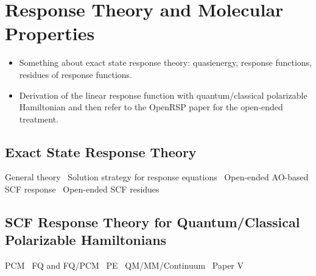\chapter{Response Theory and Molecular Properties}\label{ch:molprop}

\begin{epigraphs}
\end{epigraphs}

\begin{itemize}
    \item Something about exact state response theory: quasienergy,
      response functions, residues of response functions.
    \item  Derivation of the linear response function with
      quantum/classical polarizable Hamiltonian and then refer to the
      OpenRSP paper for the open-ended treatment.~\autocite{pcm-openrsp}
\end{itemize}

\section{Exact State Response Theory}\label{sec:exact-response}

General theory~\autocite{Olsen1985-nr, Christiansen1998-pe,
Norman2011-ad, Helgaker2012-cz, Pawlowski2015-sq}
Solution strategy for response equations~\autocite{Kauczor2011-rd}
Open-ended \acrshort{AO}-based \acrshort{SCF} response~\autocite{
Larsen2000-hj, Kjaergaard2008-hy, Thorvaldsen2008-sg,
Kristensen2008-hv, Ringholm2014-gx}
Open-ended \acrshort{SCF} residues~\autocite{Friese2015-kb}


\section{SCF Response Theory for Quantum/Classical Polarizable Hamiltonians}\label{sec:csm-response}

\acrshort{PCM}~\autocite{Cammi1994-qj, Cammi1996-wf, Cammi1996-vx,
Cammi1999-rb, Cammi2003-qy, Frediani2005-nc, Ferrighi2010-pm}
\acrshort{FQ} and \acrshort{FQ}/\acrshort{PCM}~\autocite{Lipparini2012-hx, Lipparini2012-tl, Lipparini2013-ud}
\acrshort{PE}~\autocite{Olsen2010-wa}
\acrshort{QM}/\acrshort{MM}/Continuum~\autocite{Stenidal2011-ki, Caprasecca2012-ir}
Paper V~\autocite{pcm-openrsp}

